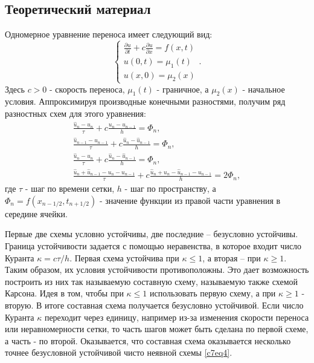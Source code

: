 \chapter{}

\section{Теоретический материал}
Одномерное уравнение переноса имеет следующий вид:
\begin{equation} \label{c7eq1}
	\begin{cases}
		\displaystyle \frac{\partial u}{\partial t} + c \frac{\partial u}{\partial x} = f(x,t) \\
		u(0,t) = \mu_1(t) \\
		u(x,0) = \mu_2(x)
	\end{cases}.
\end{equation}
Здесь $c > 0$ - скорость переноса, $\mu_1(t)$ - граничное, а $\mu_2(x)$ - начальное условия. Аппроксимируя производные конечными разностями, получим ряд разностных схем для этого уравнения:
\begin{align}
	\frac{\hat{u}_n - u_n}{\tau} + c \frac{u_n - u_{n-1}}{h} = \Phi_n, \label{c7eq2} \\
	\frac{\hat{u}_{n-1} - u_{n-1}}{\tau} + c \frac{\hat{u}_n - \hat{u}_{n-1}}{h} = \Phi_n, \label{c7eq3} \\
	\frac{\hat{u}_n - u_n}{\tau} +  c \frac{\hat{u}_n - \hat{u}_{n-1}}{h} = \Phi_n, \label{c7eq4} \\
	\frac{\hat{u}_n + \hat{u}_{n-1} - u_n - u_{n-1}}{\tau} + c \frac{\hat{u}_n + u_n - \hat{u}_{n-1} - u_{n-1}}{h} = 2 \Phi_n, \label{c7eq5}
\end{align}
где $\tau$ - шаг по времени сетки, $h$ - шаг по пространству, а $\Phi_n = f(x_{n-1/2}, t_{n+1/2})$ - значение функции из правой части уравнения в середине ячейки.

Первые две схемы условно устойчивы, две последние – безусловно устойчивы. Граница устойчивости задается с помощью неравенства, в которое входит число Куранта $\kappa = c\tau/h$. Первая схема устойчива при $\kappa \leq 1$, а вторая – при $\kappa \geq 1$. Таким образом, их условия устойчивости противоположны. Это дает возможность построить из них так называемую составную схему, называемую также схемой Карсона. Идея в том, чтобы при $\kappa \leq 1$ использовать первую схему, а при $\kappa \geq 1$ - вторую. В итоге составная схема получается безусловно устойчивой. Если число Куранта $\kappa$ переходит через единицу, например из-за изменения скорости переноса или неравномерности сетки, то часть шагов может быть сделана по первой схеме, а часть - по второй. Оказывается, что составная схема оказывается несколько точнее безусловной устойчивой чисто неявной схемы \eqref{c7eq4}.

